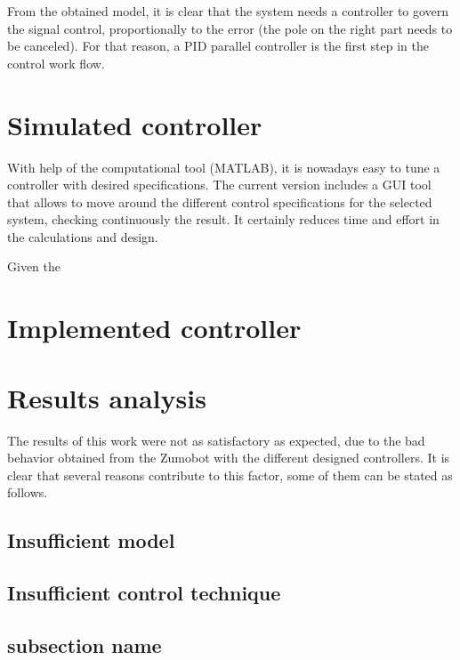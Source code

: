 
From the obtained model, it is clear that the system needs a controller to govern the signal control, proportionally to the error (the pole on the right part needs to be canceled). For that reason, a PID parallel controller is the first step in the control work flow.

\section{Simulated controller}

With help of the computational tool (MATLAB), it is nowadays easy to tune a controller with desired specifications. The current version includes a GUI tool that allows to move around the different control specifications for the selected system, checking continuously the result. It certainly reduces time and effort in the calculations and design.

Given the

\section{Implemented controller}

\section{Results analysis}

The results of this work were not as satisfactory as expected, due to the bad behavior obtained from the Zumobot with the different designed controllers. It is clear that several reasons contribute to this factor, some of them can be stated as follows.

\subsection{Insufficient model}

\subsection{Insufficient control technique}

\subsection{subsection name}
